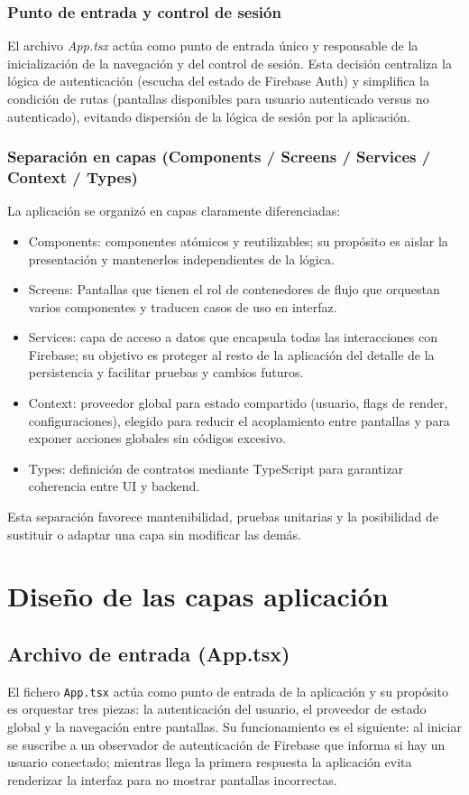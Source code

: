 \documentclass[twoside, openright, 11pt]{report}
\begin{document}
			\subsubsection{Punto de entrada y control de sesión}
				El archivo \textit{App.tsx} actúa como punto de entrada único y responsable de la inicialización de la navegación y del control de sesión. Esta decisión centraliza la lógica de autenticación (escucha del estado de Firebase Auth) y simplifica la condición de rutas (pantallas disponibles para usuario autenticado versus no autenticado), evitando dispersión de la lógica de sesión por la aplicación.
			
			\subsubsection{Separación en capas (Components / Screens / Services / Context / Types)}
				La aplicación se organizó en capas claramente diferenciadas:
				\begin{itemize}
					\item Components: componentes atómicos y reutilizables; su propósito es aislar la presentación y mantenerlos independientes de la lógica.
					\item Screens: Pantallas que tienen el rol de contenedores de flujo que orquestan varios componentes y traducen casos de uso en interfaz.
					\item Services: capa de acceso a datos que encapsula todas las interacciones con Firebase; su objetivo es proteger al resto de la aplicación del detalle de la persistencia y facilitar pruebas y cambios futuros.
					\item Context: proveedor global para estado compartido (usuario, flags de render, configuraciones), elegido para reducir el acoplamiento entre pantallas y para exponer acciones globales sin códigos excesivo.
					\item Types: definición de contratos mediante TypeScript para garantizar coherencia entre UI y backend.
				\end{itemize}
				Esta separación favorece mantenibilidad, pruebas unitarias y la posibilidad de sustituir o adaptar una capa sin modificar las demás.
	
	\section{Diseño de las capas aplicación}
	
		\subsection{Archivo de entrada (App.tsx)}
			El fichero \texttt{App.tsx} actúa como punto de entrada de la aplicación y su propósito es orquestar tres piezas: la autenticación del usuario, el proveedor de estado global y la navegación entre pantallas. Su funcionamiento es el siguiente: al iniciar se suscribe a un observador de autenticación de Firebase que informa si hay un usuario conectado; mientras llega la primera respuesta la aplicación evita renderizar la interfaz para no mostrar pantallas incorrectas. 
			
\end{document}
